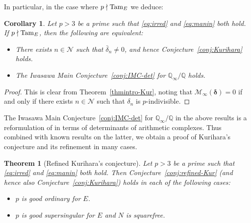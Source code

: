 \documentclass[10pt,reqno]{amsart}
\numberwithin{equation}{section}
\theoremstyle{plain}
\theoremstyle{definition}
\theoremstyle{definition}
\theoremstyle{plain}
\theoremstyle{plain}
\theoremstyle{plain}
\theoremstyle{plain}
\theoremstyle{plain}
\newtheorem{thmintro}{Theorem}
\theoremstyle{plain}
\newtheorem{corintro}{Corollary}
\newcommand{\Q}{\mathbb{Q}}
\begin{document}
In particular, in the case where $p\nmid{\rm Tam}_E$ we deduce:

\begin{corintro}\label{corintro:refined-Kur}
Let $p>3$ be a prime such that \eqref{eq:irred} and \eqref{eq:manin} both hold. 
If $p\nmid{\rm Tam}_E$, then the following are equivalent:
\begin{itemize}
\item[(i)] There exists $n\in \mathcal{N}$ such that $\bar{\delta}_{n}\neq 0$, and hence Conjecture~\ref{conj:Kurihara} holds.
\item[(ii)] The Iwasawa Main Conjecture~\ref{conj:IMC-det} for $\Q_\infty/\Q$ holds.
\end{itemize}
\end{corintro}

\begin{proof}
This is clear from Theorem~\ref{thmintro-Kur}, noting that   $\mathscr{M}_\infty(\boldsymbol{\delta})=0$ if and only if there exists $n\in\mathcal{N}$ such that $\delta_n$ is $p$-indivisible.
\end{proof}

The Iwasawa Main Conjecture~\ref{conj:IMC-det} for $\Q_\infty/\Q$ in the above results is a reformulation of %
\cite[Conj.~12.10]{kato-euler-systems} in terms of determinants of arithmetic complexes. 
Thus combined with known results on the latter, we obtain a proof of Kurihara's conjecture and its refinement in many cases.

\begin{thmintro}
[Refined Kurihara's conjecture]\label{corintro:kur-cases}
Let $p>3$ be a prime such that \eqref{eq:irred} and \eqref{eq:manin} both hold. Then Conjecture~\ref{conj:refined-Kur} (and hence also Conjecture~\ref{conj:Kurihara}) 
holds in each of the following cases:
\begin{itemize}
\item[$\circ$] $p$ is good ordinary for $E$. 
\item[$\circ$] $p$ is good supersingular for $E$ and $N$ is squarefree.
\end{itemize}
\end{thmintro}
\end{document}
